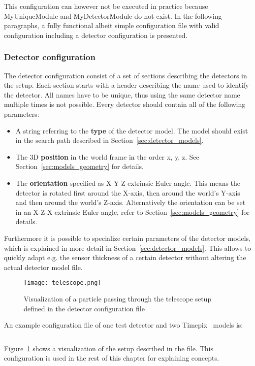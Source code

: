 This configuration can however not be executed in practice because MyUniqueModule and MyDetectorModule do not exist.
In the following paragraphs, a fully functional albeit simple configuration file with valid configuration including a detector configuration is presented.

\subsubsection{Detector configuration}
\label{sec:detector_config}
The detector configuration consist of a set of sections describing the detectors in the setup.
Each section starts with a header describing the name used to identify the detector.
All names have to be unique, thus using the same detector name multiple times is not possible.
Every detector should contain all of the following parameters:
\begin{itemize}
\item A string referring to the \textbf{type} of the detector model.
The model should exist in the search path described in Section~\ref{sec:detector_models}.
\item The 3D \textbf{position} in the world frame in the order x, y, z.
See Section~\ref{sec:models_geometry} for details.
\item The \textbf{orientation} specified as X-Y-Z extrinsic Euler angle.
This means the detector is rotated first around the X-axis, then around the world's Y-axis and then around the world's Z-axis.
Alternatively the orientation can be set in an X-Z-X extrinsic Euler angle, refer to Section~\ref{sec:models_geometry} for details.
\end{itemize}
Furthermore it is possible to specialize certain parameters of the detector models, which is explained in more detail in Section~\ref{sec:detector_models}.
This allows to quickly adapt e.g. the sensor thickness of a certain detector without altering the actual detector model file.

\begin{figure}[t]
  \centering
  \texttt{[image: telescope.png]}
  \caption{Visualization of a particle passing through the telescope setup defined in the detector configuration file}
  \label{fig:telescope}
\end{figure}

An example configuration file of one test detector and two Timepix~\cite{timepix} models is:
\inputminted[frame=single,framesep=3pt,breaklines=true,tabsize=2,linenos]{ini}{../../etc/manual_detector.conf}
Figure~\ref{fig:telescope} shows a visualization of the setup described in the file.
This configuration is used in the rest of this chapter for explaining concepts.

